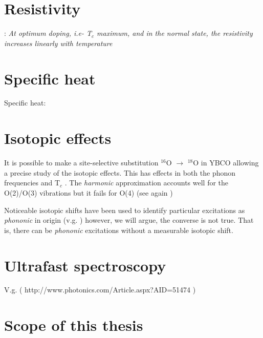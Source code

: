 \section{Resistivity}
\label{sec:resistivity}

\cite{Muller2007a}: \textit{At optimum doping, i.e- T$_c$ maximum, and in the normal state, the resistivity increases linearly with temperature}

\section{Specific heat}
\label{sec:specific_heat}

Specific heat: \cite{Loram1993}


\section{Isotopic effects}
\label{sec:isotopic_effects}

It is possible to make a site-selective substitution $^{16}$O $\rightarrow$ $^{18}$O in YBCO \cite{Conder1993} allowing a precise study of the isotopic effects. 
This has effects in both the phonon frequencies \cite{Ruani1994} and T$_{c}$ \cite{Zech1994,Cardona1988}. 
The \textit{harmonic} approximation accounts well for the O(2)/O(3) vibrations but it fails for O(4) (see again \cite{Ruani1994})

Noticeable isotopic shifts have been used to identify particular excitations as \textit{phononic} in origin (v.g. \cite{Thomsen1990}) however, we will argue, the converse is not true. 
That is, there can be \textit{phononic} excitations without a measurable isotopic shift.

\section{Ultrafast spectroscopy}
\label{sec:ultrafast_spect}

V.g. \cite{Basov2005} \cite{Smallwood2012} ( http://www.photonics.com/Article.aspx?AID=51474 )

\section{Scope of this thesis}
\label{sec:scope}


